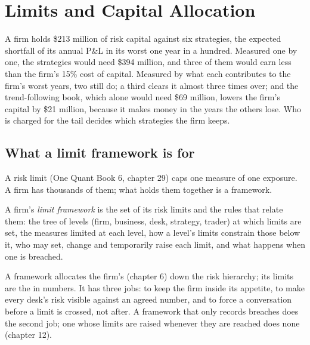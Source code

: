 \chapter{Limits and Capital Allocation}\label{ch:fm:limits-and-capital-allocation}

A firm holds \$213 million of risk capital against six strategies, the expected shortfall of its annual P\&L in its worst one year in a hundred.
Measured one by one, the strategies would need \$394 million, and three of them would earn less than the firm's 15\% cost of capital. Measured by
what each contributes to the firm's worst years, two still do; a third clears it almost three times over; and the trend-following book, which
alone would need \$69 million, lowers the firm's capital by \$21 million, because it makes money in the years the others lose. Who is charged
for the tail decides which strategies the firm keeps.

\section{What a limit framework is for}

A risk limit (One Quant Book 6, chapter 29) caps one measure of one exposure. A firm has thousands of them; what holds them together is a
framework.

\begin{definition}\label{def:fm:limits-and-capital-allocation:framework}
A firm's \emph{limit framework} is the set of its risk limits and the rules that relate them: the tree of levels (firm,
business, desk, strategy, trader) at which limits are set, the measures limited at each level, how a level's limits constrain those below it, who
may set, change and temporarily raise each limit, and what happens when one is breached.
\end{definition}

A framework allocates the firm's  (chapter 6) down the risk hierarchy; its limits are the  in numbers. It has
three jobs: to keep the firm inside its appetite, to make every desk's risk visible against an agreed number, and to force a conversation before a
limit is crossed, not after. A framework that only records breaches does the second job; one whose limits are raised whenever they are reached
does none (chapter 12).

